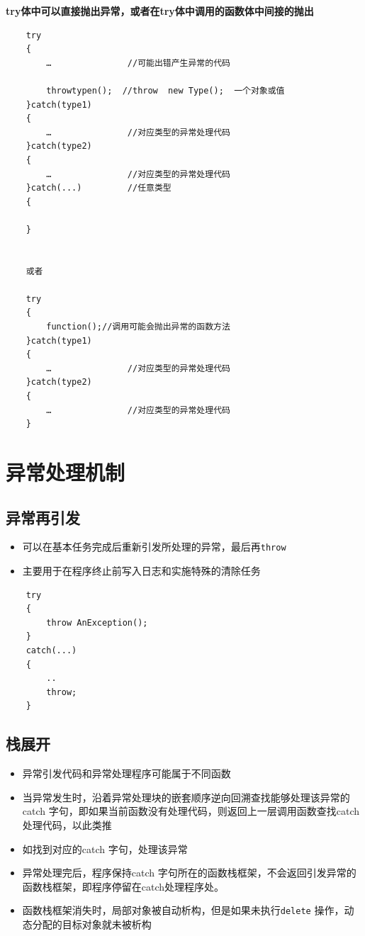 \documentclass[UTF8,a4paper,12pt]{ctexbook}
\begin{document}
		\textbf{try体中可以直接抛出异常，或者在try体中调用的函数体中间接的抛出}
		\begin{lstlisting}
	try
	{
		…               //可能出错产生异常的代码
	
		throwtypen();  //throw  new Type();  一个对象或值
	}catch(type1)
	{
		…               //对应类型的异常处理代码
	}catch(type2)
	{
		…               //对应类型的异常处理代码
	}catch(...) 		//任意类型
	{
	
	}  
	

	或者
	
	try	
	{
		function();//调用可能会抛出异常的函数方法
	}catch(type1)
	{
		…               //对应类型的异常处理代码
	}catch(type2)
	{
		…               //对应类型的异常处理代码
	}	
		\end{lstlisting}

	\section{异常处理机制}
		\subsection{异常再引发}
			\begin{itemize}
			\item 可以在基本任务完成后重新引发所处理的异常，最后再\verb|throw|
			\item 主要用于在程序终止前写入日志和实施特殊的清除任务
			\end{itemize}
			
			\begin{lstlisting}
	try
	{
		throw AnException();
	}
	catch(...)
	{
		..
		throw;
	}
			\end{lstlisting}
			
		\subsection{栈展开}
			\begin{itemize}
				\item  异常引发代码和异常处理程序可能属于不同函数
				\item  当异常发生时，沿着异常处理块的嵌套顺序逆向回溯查找能够处理该异常的catch 字句，即如果当前函数没有处理代码，则返回上一层调用函数查找catch处理代码，以此类推
				\item  如找到对应的catch 字句，处理该异常
				\item  异常处理完后，程序保持catch 字句所在的函数栈框架，不会返回引发异常的函数栈框架，即程序停留在catch处理程序处。
				\item  函数栈框架消失时，局部对象被自动析构，但是如果未执行\verb|delete| 操作，动态分配的目标对象就未被析构
			\end{itemize}
			
\end{document}
